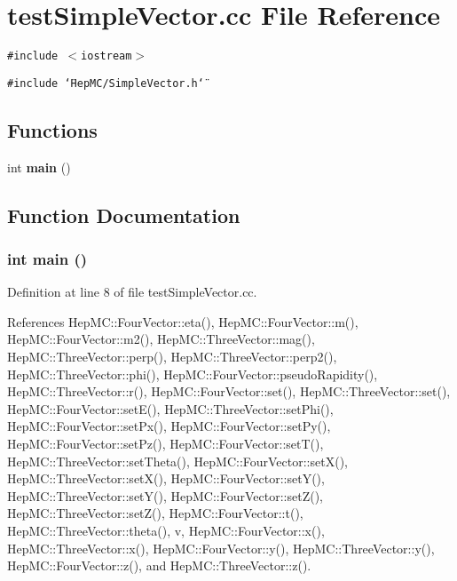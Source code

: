 \section{test\-Simple\-Vector.cc File Reference}
\label{testSimpleVector_8cc}
{\tt \#include $<$iostream$>$}\par
{\tt \#include \char`\"{}Hep\-MC/Simple\-Vector.h\char`\"{}}\par
\subsection*{Functions}
\begin{CompactItemize}
\item 
int {\bf main} ()
\end{CompactItemize}


\subsection{Function Documentation}
\subsubsection{\setlength{\rightskip}{0pt plus 5cm}int main ()}\label{testSimpleVector_8cc_e66f6b31b5ad750f1fe042a706a4e3d4}




Definition at line 8 of file test\-Simple\-Vector.cc.

References Hep\-MC::Four\-Vector::eta(), Hep\-MC::Four\-Vector::m(), Hep\-MC::Four\-Vector::m2(), Hep\-MC::Three\-Vector::mag(), Hep\-MC::Three\-Vector::perp(), Hep\-MC::Three\-Vector::perp2(), Hep\-MC::Three\-Vector::phi(), Hep\-MC::Four\-Vector::pseudo\-Rapidity(), Hep\-MC::Three\-Vector::r(), Hep\-MC::Four\-Vector::set(), Hep\-MC::Three\-Vector::set(), Hep\-MC::Four\-Vector::set\-E(), Hep\-MC::Three\-Vector::set\-Phi(), Hep\-MC::Four\-Vector::set\-Px(), Hep\-MC::Four\-Vector::set\-Py(), Hep\-MC::Four\-Vector::set\-Pz(), Hep\-MC::Four\-Vector::set\-T(), Hep\-MC::Three\-Vector::set\-Theta(), Hep\-MC::Four\-Vector::set\-X(), Hep\-MC::Three\-Vector::set\-X(), Hep\-MC::Four\-Vector::set\-Y(), Hep\-MC::Three\-Vector::set\-Y(), Hep\-MC::Four\-Vector::set\-Z(), Hep\-MC::Three\-Vector::set\-Z(), Hep\-MC::Four\-Vector::t(), Hep\-MC::Three\-Vector::theta(), v, Hep\-MC::Four\-Vector::x(), Hep\-MC::Three\-Vector::x(), Hep\-MC::Four\-Vector::y(), Hep\-MC::Three\-Vector::y(), Hep\-MC::Four\-Vector::z(), and Hep\-MC::Three\-Vector::z().